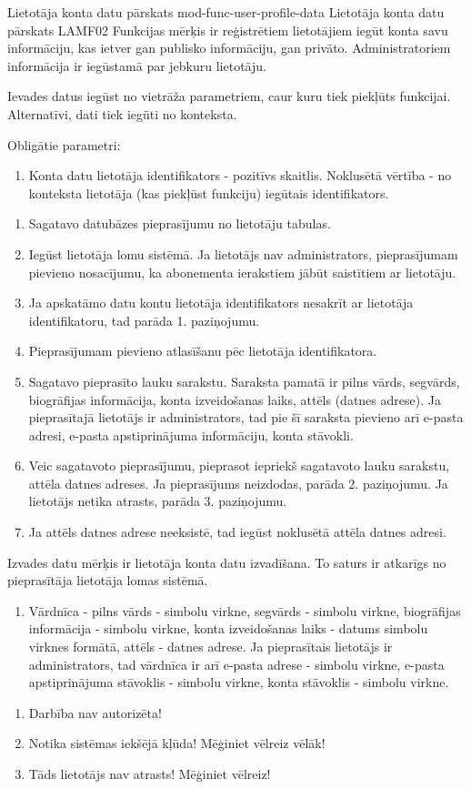 \moduleFunctionTable
{Lietotāja konta datu pārskats}
{mod-func-user-profile-data}
{Lietotāja konta datu pārskats}
{LAMF02}
{
	Funkcijas mērķis ir reģistrētiem lietotājiem iegūt konta savu informāciju, kas ietver gan publisko informāciju, gan privāto.
	Administratoriem informācija ir iegūstamā par jebkuru lietotāju.
}
{
	Ievades datus iegūst no vietrāža parametriem, caur kuru tiek piekļūts funkcijai.
	Alternatīvi, dati tiek iegūti no konteksta.

	Obligātie parametri:
	\begin{enumerate}
		\item Konta datu lietotāja identifikators - pozitīvs skaitlis.
		      Noklusētā vērtība - no konteksta lietotāja (kas piekļūst funkciju) iegūtais identifikators.
	\end{enumerate}
}
{
	\begin{enumerate}
		\item Sagatavo datubāzes pieprasījumu no lietotāju tabulas.
		\item Iegūst lietotāja lomu sistēmā.
		      Ja lietotājs nav administrators, pieprasījumam pievieno nosacījumu, ka abonementa ierakstiem jābūt saistītiem ar lietotāju.
		\item Ja apskatāmo datu kontu lietotāja identifikators nesakrīt ar lietotāja identifikatoru, tad parāda 1. paziņojumu.
		\item Pieprasījumam pievieno atlasīšanu pēc lietotāja identifikatora.
		\item Sagatavo pieprasīto lauku sarakstu.
		      Saraksta pamatā ir pilns vārds, segvārds, biogrāfijas informācija, konta izveidošanas laiks, attēls (datnes adrese).
		      Ja pieprasītajā lietotājs ir administrators, tad pie šī saraksta pievieno arī e-pasta adresi, e-pasta apstiprinājuma informāciju, konta stāvokli.
		\item Veic sagatavoto pieprasījumu, pieprasot iepriekš sagatavoto lauku sarakstu, attēla datnes adreses.
		      Ja pieprasījums neizdodas, parāda 2. paziņojumu.
		      Ja lietotājs netika atrasts, parāda 3. paziņojumu.
		\item Ja attēls datnes adrese neeksistē, tad iegūst noklusētā attēla datnes adresi.
	\end{enumerate}
}
{
	Izvades datu mērķis ir lietotāja konta datu izvadīšana.
	To saturs ir atkarīgs no pieprasītāja lietotāja lomas sistēmā.

	\begin{enumerate}
		\item Vārdnīca - pilns vārds - simbolu virkne, segvārds - simbolu virkne, biogrāfijas informācija - simbolu virkne, konta izveidošanas laiks - datums simbolu virknes formātā, attēls - datnes adrese.
		      Ja pieprasītais lietotājs ir administrators, tad vārdnīca ir arī e-pasta adrese - simbolu virkne, e-pasta apstiprinājuma stāvoklis - simbolu virkne, konta stāvoklis - simbolu virkne.
	\end{enumerate}

}
{
	\begin{enumerate}
		\item Darbība nav autorizēta!
		\item Notika sistēmas iekšējā kļūda! Mēģiniet vēlreiz vēlāk!
		\item Tāds lietotājs nav atrasts! Mēģiniet vēlreiz!
	\end{enumerate}
}
